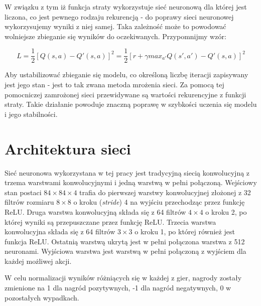 \documentclass[12pt]{article}
\begin{document}
W związku z tym iż funkcja straty wykorzystuje sieć neuronową dla której jest liczona, co jest pewnego rodzaju rekurencją - do poprawy sieci neuronowej wykorzysujemy wyniki z niej samej. Taka zależność może to powodować wolniejsze zbieganie się wyników do oczekiwanych. Przypomnijmy wzór: 

$$L=\frac{1}{2}[Q(s,a)-Q'(s,a)]^2=\frac{1}{2}[r+\gamma max_{a'}Q(s',a')-Q'(s,a)]^2$$

Aby ustabilizować zbieganie się modelu, co określoną liczbę iteracji zapisywany jest jego stan - jest to tak zwana metoda mrożenia sieci. Za pomocą tej pomocniczej zamrożonej sieci przewidywane są wartości rekurencyjne z funkcji straty. Takie działanie powoduje znaczną poprawę w szybkości uczenia się modelu i jego stabilności.

\section{Architektura sieci \cite{deepmind_2}}

Sieć neuronowa wykorzystana w tej pracy jest tradycyjną siecią konwolucyjną z trzema warstwami konwolucyjnymi i jedną warstwą w pełni połączoną. Wejściowy stan postaci $84\times84\times4$ trafia do pierwszej warstwy konwolucyjnej złożonej z 32 filtrów rozmiaru $8\times8$ o kroku (\textit{stride}) 4 na wyjściu przechodząc przez funkcję ReLU. Druga warstwa konwolucyjną składa się z 64 filtrów $4\times4$ o kroku 2, po której wyniki są przepuszczane przez funkcję ReLU. Trzecia warstwa konwolucyjna składa się z 64 filtrów $3\times3$ o kroku 1, po której również jest funkcja ReLU. Ostatnią warstwą ukrytą jest w pełni połączona warstwa z 512 neuronami. Wyjściowa warstwa jest warstwą w pełni połączoną z wyjściem dla każdej możliwej akcji.

W celu normalizacji wyników różniących się w każdej z gier, nagrody zostały zmienione na 1 dla nagród pozytywnych, -1 dla nagród negatywnych, 0 w pozostałych wypadkach.
\end{document}
